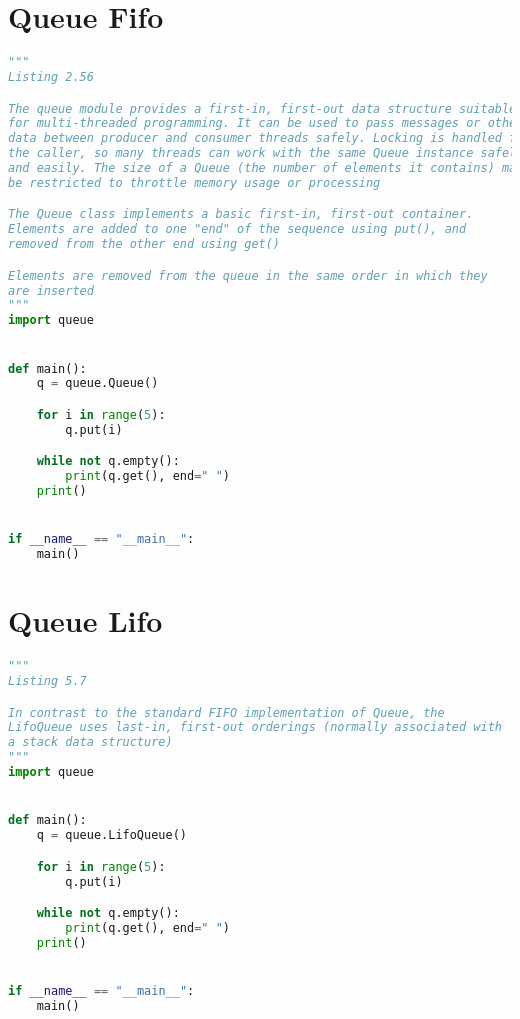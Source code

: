 \documentclass[a4paper,landscape]{report}
\begin{document}
\section{Queue Fifo}
\begin{lstlisting}[language=Python]
"""
Listing 2.56

The queue module provides a first-in, first-out data structure suitable
for multi-threaded programming. It can be used to pass messages or other
data between producer and consumer threads safely. Locking is handled for
the caller, so many threads can work with the same Queue instance safely
and easily. The size of a Queue (the number of elements it contains) may
be restricted to throttle memory usage or processing

The Queue class implements a basic first-in, first-out container.
Elements are added to one "end" of the sequence using put(), and
removed from the other end using get()

Elements are removed from the queue in the same order in which they
are inserted
"""
import queue


def main():
    q = queue.Queue()

    for i in range(5):
        q.put(i)

    while not q.empty():
        print(q.get(), end=" ")
    print()


if __name__ == "__main__":
    main()

\end{lstlisting}
\section{Queue Lifo}
\begin{lstlisting}[language=Python]
"""
Listing 5.7

In contrast to the standard FIFO implementation of Queue, the
LifoQueue uses last-in, first-out orderings (normally associated with
a stack data structure)
"""
import queue


def main():
    q = queue.LifoQueue()

    for i in range(5):
        q.put(i)

    while not q.empty():
        print(q.get(), end=" ")
    print()


if __name__ == "__main__":
    main()

\end{lstlisting}
\end{document}
